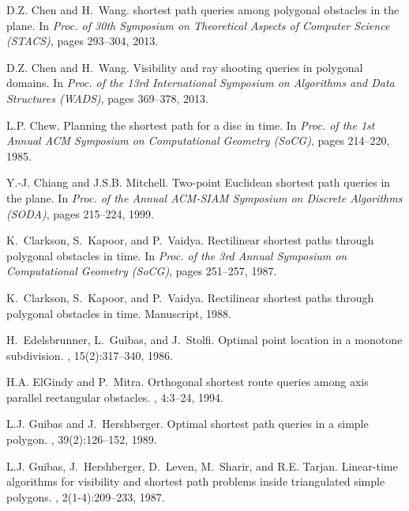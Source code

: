 \documentclass[english,runningheads,11pt]{llncs}
\begin{document}
\begin{thebibliography}{10}
D.Z. Chen and H.~Wang.
\newblock {} shortest path queries among polygonal obstacles in the plane.
\newblock In {\em Proc. of 30th Symposium on Theoretical Aspects of Computer
  Science (STACS)}, pages 293--304, 2013.

D.Z. Chen and H.~Wang.
\newblock Visibility and ray shooting queries in polygonal domains.
\newblock In {\em Proc. of the 13rd International Symposium on Algorithms and
  Data Structures (WADS)}, pages 369--378, 2013.

L.P. Chew.
\newblock Planning the shortest path for a disc in {} time.
\newblock In {\em Proc. of the 1st Annual ACM Symposium on Computational
  Geometry (SoCG)}, pages 214--220, 1985.

Y.-J. Chiang and J.S.B. Mitchell.
\newblock Two-point {Euclidean} shortest path queries in the plane.
\newblock In {\em Proc. of the Annual ACM-SIAM Symposium on Discrete Algorithms
  (SODA)}, pages 215--224, 1999.

K.~Clarkson, S.~Kapoor, and P.~Vaidya.
\newblock Rectilinear shortest paths through polygonal obstacles in {} time.
\newblock In {\em Proc. of the 3rd Annual Symposium on Computational Geometry
  (SoCG)}, pages 251--257, 1987.

K.~Clarkson, S.~Kapoor, and P.~Vaidya.
\newblock Rectilinear shortest paths through polygonal obstacles in {} time.
\newblock Manuscript, 1988.

H.~Edelsbrunner, L.~Guibas, and J.~Stolfi.
\newblock Optimal point location in a monotone subdivision.
, 15(2):317--340, 1986.

H.A. ElGindy and P.~Mitra.
\newblock Orthogonal shortest route queries among axis parallel rectangular
  obstacles.
, 4:3--24, 1994.

L.J. Guibas and J.~Hershberger.
\newblock Optimal shortest path queries in a simple polygon.
, 39(2):126--152, 1989.

L.J. Guibas, J.~Hershberger, D.~Leven, M.~Sharir, and R.E. Tarjan.
\newblock Linear-time algorithms for visibility and shortest path problems
  inside triangulated simple polygons.
, 2(1-4):209--233, 1987.


\end{thebibliography}
\end{document}
